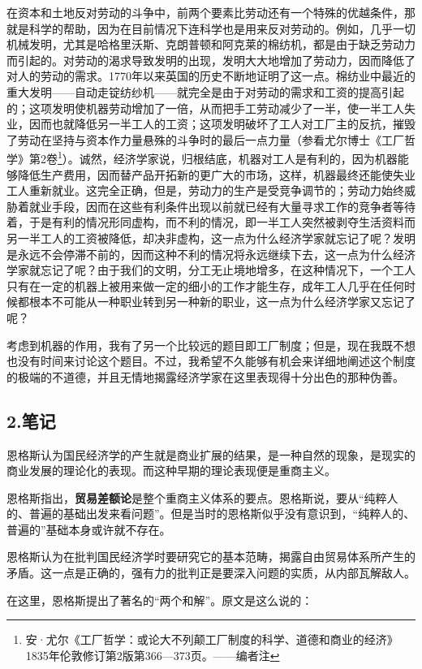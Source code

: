 \documentclass[a4paper,twoside,12pt]{ctexart}
\begin{document}
在资本和土地反对劳动的斗争中，前两个要素比劳动还有一个特殊的优越条件，那就是科学的帮助，因为在目前情况下连科学也是用来反对劳动的。例如，几乎一切机械发明，尤其是哈格里沃斯、克朗普顿和阿克莱的棉纺机，都是由于缺乏劳动力而引起的。对劳动的渴求导致发明的出现，发明大大地增加了劳动力，因而降低了对人的劳动的需求。1770年以来英国的历史不断地证明了这一点。棉纺业中最近的重大发明——自动走锭纺纱机——就完全是由于对劳动的需求和工资的提高引起的；这项发明使机器劳动增加了一倍，从而把手工劳动减少了一半，使一半工人失业，因而也就降低另一半工人的工资；这项发明破坏了工人对工厂主的反抗，摧毁了劳动在坚持与资本作力量悬殊的斗争时的最后一点力量（参看尤尔博士《工厂哲学》第2卷\footnote{安·尤尔《工厂哲学：或论大不列颠工厂制度的科学、道德和商业的经济》1835年伦敦修订第2版第366—373页。——编者注}）。诚然，经济学家说，归根结底，机器对工人是有利的，因为机器能够降低生产费用，因而替产品开拓新的更广大的市场，这样，机器最终还能使失业工人重新就业。这完全正确，但是，劳动力的生产是受竞争调节的；劳动力始终威胁着就业手段，因而在这些有利条件出现以前就已经有大量寻求工作的竞争者等待着，于是有利的情况形同虚构，而不利的情况，即一半工人突然被剥夺生活资料而另一半工人的工资被降低，却决非虚构，这一点为什么经济学家就忘记了呢？发明是永远不会停滞不前的，因而这种不利的情况将永远继续下去，这一点为什么经济学家就忘记了呢？由于我们的文明，分工无止境地增多，在这种情况下，一个工人只有在一定的机器上被用来做一定的细小的工作才能生存，成年工人几乎在任何时候都根本不可能从一种职业转到另一种新的职业，这一点为什么经济学家又忘记了呢？

考虑到机器的作用，我有了另一个比较远的题目即工厂制度；但是，现在我既不想也没有时间来讨论这个题目。不过，我希望不久能够有机会来详细地阐述这个制度的极端的不道德，并且无情地揭露经济学家在这里表现得十分出色的那种伪善。 

\newpage

\subsection{2.笔记}
恩格斯认为国民经济学的产生就是商业扩展的结果，是一种自然的现象，是现实的商业发展的理论化的表现。而这种早期的理论表现便是重商主义。

恩格斯指出，\textbf{贸易差额论}是整个重商主义体系的要点。恩格斯说，要从“纯粹人的、普遍的基础出发来看问题”。但是当时的恩格斯似乎没有意识到，“纯粹人的、普遍的”基础本身或许就不存在。

恩格斯认为在批判国民经济学时要研究它的基本范畴，揭露自由贸易体系所产生的矛盾。这一点是正确的，强有力的批判正是要深入问题的实质，从内部瓦解敌人。

在这里，恩格斯提出了著名的“两个和解”。原文是这么说的：
\end{document}
